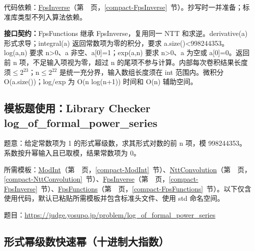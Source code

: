代码依赖：\hyperref[compact-FpsInverse]{FpsInverse}（第~\pageref{compact-FpsInverse}~页，\ref{compact-FpsInverse}~节）。抄写时一并准备；标准库类型不列入算法依赖。

{\sloppy{}\noindent\textbf{接口契约：}FpsFunctions 继承 FpsInverse，复用同一 NTT 和求逆。derivative(a) 形式求导；integral(a) 返回常数项为零的积分，要求 a.size()<998244353。log(a,n) 要求 n>0、a 非空、a[0]=1；exp(a,n) 要求 n>0、a 为空或 a[0]=0。返回前 n 项，不足输入项视为零，超过 n 的尾项不参与计算。内部每次卷积结果长度须$\le$2$^{23}$；n$\le$2$^{22}$ 是统一充分界，输入数组长度须在 int 范围内。微积分 O(a.size())；log/exp 为 O(n log(n+1)) 时间和 O(n) 辅助空间。\par}

\Needspace{426pt}



\newpage



\Needspace{293pt}

\subsection*{模板题使用：Library Checker log\_of\_formal\_power\_series}

\label{usage-example-28}

题意：给定常数项为 1 的形式幂级数，求其形式对数的前 n 项，模 998244353。系数按升幂输入且已取模，结果常数项为 0。

所需模板：\hyperref[compact-ModInt]{ModInt}（第~\pageref{compact-ModInt}~页，\ref{compact-ModInt}~节）、\hyperref[compact-NttConvolution]{NttConvolution}（第~\pageref{compact-NttConvolution}~页，\ref{compact-NttConvolution}~节）、\hyperref[compact-FpsInverse]{FpsInverse}（第~\pageref{compact-FpsInverse}~页，\ref{compact-FpsInverse}~节）、\hyperref[compact-FpsFunctions]{FpsFunctions}（第~\pageref{compact-FpsFunctions}~页，\ref{compact-FpsFunctions}~节）。以下仅含使用代码，默认已粘贴所需模板并包含标准头文件、使用 std 命名空间。

题目：\url{https://judge.yosupo.jp/problem/log_of_formal_power_series}



\subsection{形式幂级数快速幂（十进制大指数）}\label{compact-FpsPower}

